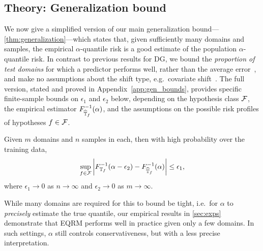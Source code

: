 \documentclass{article}
\begin{document}
%
%
%


%
%
%
%
%
%
%

%
%
%
%
%
%
%
%
%
%
%
%
%

\subsection{Theory: Generalization bound}\label{sec:qrm_algs:gen_bound}
%
%
We now give a simplified version of our main generalization bound---\cref{thm:generalization}---which states that, given sufficiently many domains and samples, the empirical $\alpha$-quantile risk
%
is a good estimate of the population $\alpha$-quantile risk. In contrast to previous results for DG, we bound the \emph{proportion of test domains} for which a predictor performs well, rather than the average error~\citep{blanchard2011generalizing, blanchard2021domain}, and make no assumptions about the shift type, e.g.\ covariate shift~\citep{muandet2013domain}.  The full version, stated and proved in Appendix~\ref{app:gen_bounds}, provides specific finite-sample bounds on $\epsilon_1$ and $\epsilon_2$ below, depending on the hypothesis class $\mathcal{F}$, the empirical estimator
$F^{-1}_{\widehat{\mathbb{T}}_f}(\alpha)$,
%
%
and the assumptions on the possible risk profiles of hypotheses $f \in \mathcal{F}$. 
%
%
\begin{theorem}\label{thm:simplified-gen-bound}
%
Given $m$ domains and $n$ samples in each, then with high probability over the training data,
\begin{equation}
    \sup_{f \in \mathcal{F}} \left|
    F^{-1}_{\mathbb{T}_f}(\alpha - \epsilon_2) - 
    F^{-1}_{\widehat{\mathbb{T}}_f}(\alpha)
    \right| \leq \epsilon_1,
    \label{ineq:simplified_generalization_bound}
\end{equation}
where $\epsilon_1 \to 0$ as $n \to \infty$ and $\epsilon_2 \to 0$ as $m \to \infty$.
\end{theorem}
%
%

%
%
While many domains are required for this to bound be tight, i.e.\ for $\alpha$ to \emph{precisely} estimate the true quantile, our empirical results in \cref{sec:exps} demonstrate that EQRM performs well in practice given only a few domains. In such settings, $\alpha$ still controls conservativeness, but with a less precise interpretation.
%

%
%
%
%
%
\end{document}
